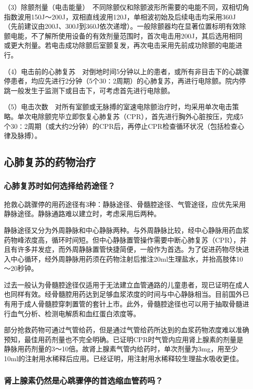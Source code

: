 （3）除颤剂量（电击能量）　不同除颤仪和除颤波形所需要的电能不同，双相切角指数波用150J～200J，双相直线波用120J，单相波初始及后续电击均采用360J（先前建议由200J、300J到360J依次递增）。一般除颤器均在显著位置标明有效除颤电能，不了解所使用设备的有效剂量范围时，首次电击用200J，其后选用相同或更大剂量。若电击成功除颤后室颤复发，再次电击采用先前成功除颤的电能进行。

（4）电击前的心肺复苏　对倒地时间5分钟以上的患者，或所有非目击下的心跳骤停患者，均应先进行2分钟（5个30∶2周期）的心肺复苏，再进行电除颤。院内停跳一般发生于监测下或目击下，可考虑首先进行电除颤。

（5）电击次数　对所有室颤或无脉搏的室速电除颤治疗时，均采用单次电击策略。单次电除颤完毕立即恢复心肺复苏（CPR），首先进行胸外心脏按压，完成5个30∶2周期（或大约2分钟）的CPR后，再停止CPR检查循环状况（包括检查心律及脉搏）。

\subsection{心肺复苏的药物治疗}

\subsubsection{心肺复苏时如何选择给药途径？}

抢救心跳骤停的用药途径有3种：静脉途径、骨髓腔途径、气管途径，应优先采用静脉途径。静脉通路难以建立时，考虑采用后两种。

静脉途径又分为外周静脉和中心静脉两种。与外周静脉比较，经中心静脉用药血浆药物峰浓度高，循环时间短。但中心静脉置管操作需要中断心肺复苏（CPR），并且有许多并发症，而外周静脉置管快捷简便，一般作为首选。为了促进药物尽快进入中心循环，经外周静脉用药须在药物注射后推注20ml生理盐水，并抬高肢体10～20秒钟。

过去一般认为骨髓腔途径仅适用于无法建立血管通路的儿童患者，现已证明在成人也同样有效。经骨髓腔用药达到足够血浆浓度的时间与中心静脉相当。目前国外已有用于成人骨髓腔穿刺置管的套针上市。此外，骨髓腔途径也可以用于抽取骨髓进行血气分析、检测电解质和血红蛋白浓度等。

部分抢救药物可通过气管给药，但是通过气管给药所达到的血浆药物浓度难以准确预知，最佳用药剂量也不完全明确。已证明CPR时气管内应用肾上腺素的剂量是静脉用药剂量的3～10倍。故肾上腺素气管内给药时，单次剂量为3mg，用至少10ml的注射用水稀释后应用。已经证明，用注射用水稀释较生理盐水吸收更佳。

\subsubsection{肾上腺素仍然是心跳骤停的首选缩血管药吗？}

